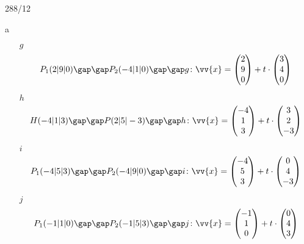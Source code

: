\begin{exercise}{288/12}
  \item [a]
  \begin{itemize}
    \item [$g$]
    \begin{gather*}
      P_1(2|9|0) \gap\gap P_2(-4|1|0) \gap\gap g \colon \vv{x} = \begin{pmatrix}2 \\ 9 \\ 0\end{pmatrix} + t \cdot \begin{pmatrix}3 \\ 4 \\ 0\end{pmatrix}
    \end{gather*}
    \item [$h$]
    \begin{gather*}
      H(-4|1|3) \gap\gap P(2|5|-3) \gap\gap h \colon \vv{x} = \begin{pmatrix}-4 \\ 1 \\ 3\end{pmatrix} + t \cdot \begin{pmatrix}3 \\ 2 \\ -3\end{pmatrix}
    \end{gather*}
    \item [$i$]
    \begin{gather*}
      P_1(-4|5|3) \gap\gap P_2(-4|9|0) \gap\gap i \colon \vv{x} = \begin{pmatrix}-4 \\ 5 \\ 3\end{pmatrix} + t \cdot \begin{pmatrix}0 \\ 4 \\ -3\end{pmatrix}
    \end{gather*}
    \item [$j$]
    \begin{gather*}
      P_1(-1|1|0) \gap\gap P_2(-1|5|3) \gap\gap j \colon \vv{x} = \begin{pmatrix}-1 \\ 1 \\ 0\end{pmatrix} + t \cdot \begin{pmatrix}0 \\ 4 \\ 3\end{pmatrix}

\end{gather*}
\end{itemize}
\end{exercise}
